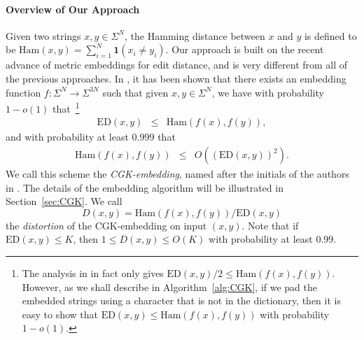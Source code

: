 \paragraph{Overview of Our Approach}  
Given two strings $x, y \in \Sigma^N$, the Hamming distance between $x$ and $y$ is defined to be $\text{Ham}(x, y) = \sum_{i=1}^N \mathbf{1}(x_i \neq y_i)$.
Our approach is built on the recent advance of metric embeddings for edit distance, and is very different from all of the previous approaches.  In \cite{CGK16}, it has been shown that there exists an embedding function $f : \Sigma^N \to \Sigma^{3N}$ such that given $x, y \in \Sigma^N$,  we have with probability $1 - o(1)$ that~\footnote{The analysis in \cite{CGK16} in fact only gives ${\text{ED}(x, y)}/2 \le  \text{Ham}(f(x), f(y))$. However, as we shall describe in Algorithm~\ref{alg:CGK}, if we pad the embedded strings using a character that is not in the dictionary, then it is easy to show that $\text{ED}(x, y) \le \text{Ham}(f(x), f(y))$ with probability $1 - o(1)$.}
\begin{eqnarray*}
\label{eq:a-1}
{\text{ED}(x, y)} &\le&  \text{Ham}(f(x), f(y)),
\end{eqnarray*}
and with probability at least $0.999$ that
\begin{eqnarray*}
\label{eq:a-2}
\text{Ham}(f(x), f(y)) &\le& O\left((\text{ED}(x, y))^2\right).
\end{eqnarray*}
We call this scheme the {\em CGK-embedding}, named after the initials of the authors in \cite{CGK16}.  The details of the embedding algorithm will be illustrated in Section~\ref{sec:CGK}.  We call 
$$D(x, y) = \text{Ham}(f(x), f(y)) / \text{ED}(x, y)$$
the {\em distortion} of the CGK-embedding on input $(x, y)$.  Note that 
if $\text{ED}(x, y) \le K$, then $1 \le D(x, y) \le O(K)$ with probability at least $0.99$.  


